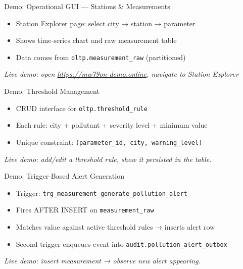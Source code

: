 \documentclass[aspectratio=169]{beamer}
\begin{document}
\begin{frame}{Demo: Operational GUI --- Stations \& Measurements}
\begin{itemize}
  \item Station Explorer page: select city → station → parameter
  \item Shows time-series chart and raw measurement table
  \item Data comes from \texttt{oltp.measurement\_raw} (partitioned)
\end{itemize}
\vspace{0.5em}
\textit{Live demo: open \url{https://mw79on-demo.online}, navigate to Station Explorer}
\end{frame}

\begin{frame}{Demo: Threshold Management}
\begin{itemize}
  \item CRUD interface for \texttt{oltp.threshold\_rule}
  \item Each rule: city + pollutant + severity level + minimum value
  \item Unique constraint: \texttt{(parameter\_id, city, warning\_level)}
\end{itemize}
\vspace{0.5em}
\textit{Live demo: add/edit a threshold rule, show it persisted in the table.}
\end{frame}

\begin{frame}{Demo: Trigger-Based Alert Generation}
\begin{itemize}
  \item Trigger: \texttt{trg\_measurement\_generate\_pollution\_alert}
  \item Fires AFTER INSERT on \texttt{measurement\_raw}
  \item Matches value against active threshold rules → inserts alert row
  \item Second trigger enqueues event into \texttt{audit.pollution\_alert\_outbox}
\end{itemize}
\vspace{0.5em}
\textit{Live demo: insert measurement → observe new alert appearing.}
\end{frame}
\end{document}
